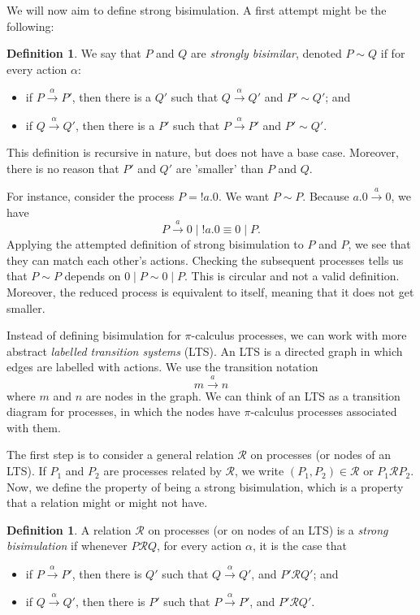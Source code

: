 \documentclass[a4paper, openany]{memoir}
\theoremstyle{definition}
\newtheorem{definition}[proposition]{Definition}
\begin{document}
    We will now aim to define strong bisimulation. A first attempt might be the following:
    \begin{definition}
        We say that $P$ and $Q$ are \emph{strongly bisimilar}, denoted $P \sim Q$ if for every action $\alpha$:
        \begin{itemize}
            \item if $P \xrightarrow{\alpha} P'$, then there is a $Q'$ such that $Q \xrightarrow{\alpha} Q'$ and $P' \sim Q'$; and
            \item if $Q \xrightarrow{\alpha} Q'$, then there is a $P'$ such that $P \xrightarrow{\alpha} P'$ and $P' \sim Q'$.
        \end{itemize}
    \end{definition}
    This definition is recursive in nature, but does not have a base case. Moreover, there is no reason that $P'$ and $Q'$ are 'smaller' than $P$ and $Q$.

    For instance, consider the process $P = !a.0$. We want $P \sim P$. Because $a.0 \xrightarrow{a} 0$, we have
    \[P \xrightarrow{a} 0 \mid !a.0 \equiv 0 \mid P.\]
    Applying the attempted definition of strong bisimulation to $P$ and $P$, we see that they can match each other's actions. Checking the subsequent processes tells us that $P \sim P$ depends on $0 \mid P \sim 0 \mid P$. This is circular and not a valid definition. Moreover, the reduced process is equivalent to itself, meaning that it does not get smaller.

    Instead of defining bisimulation for $\pi$-calculus processes, we can work with more abstract \emph{labelled transition systems} (LTS). An LTS is a directed graph in which edges are labelled with actions. We use the transition notation
    \[m \xrightarrow{a} n\]
    where $m$ and $n$ are nodes in the graph. We can think of an LTS as a transition diagram for processes, in which the nodes have $\pi$-calculus processes associated with them.

    The first step is to consider a general relation $\mathcal{R}$ on processes (or nodes of an LTS). If $P_1$ and $P_2$ are processes related by $\mathcal{R}$, we write $(P_1, P_2) \in \mathcal{R}$ or $P_1 \mathcal{R} P_2$. Now, we define the property of being a strong bisimulation, which is a property that a relation might or might not have.
    \begin{definition}
        A relation $\mathcal{R}$ on processes (or on nodes of an LTS) is a \emph{strong bisimulation} if whenever $P \mathcal{R} Q$, for every action $\alpha$, it is the case that
        \begin{itemize}
            \item if $P \xrightarrow{\alpha} P'$, then there is $Q'$ such that $Q \xrightarrow{\alpha} Q'$, and $P' \mathcal{R} Q'$; and
            \item if $Q \xrightarrow{\alpha} Q'$, then there is $P'$ such that $P \xrightarrow{\alpha} P'$, and $P' \mathcal{R} Q'$.
        \end{itemize}
    \end{definition}
\end{document}
